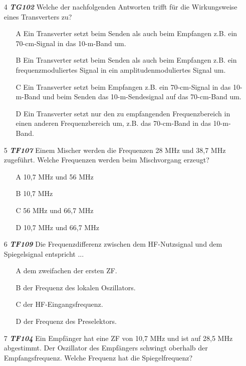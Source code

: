 \begin{enumerate} 
	\item[4] \emph{\textbf{TG102}} Welche der nachfolgenden Antworten trifft für die Wirkungsweise eines Transverters zu?
	\begin{enumerate}
	\itemsep1pt\parskip0pt
		\item[A] Ein Transverter setzt beim Senden als auch beim Empfangen z.B. ein 70-cm-Signal in das 10-m-Band um.
		\item[B] Ein Transverter setzt beim Senden als auch beim Empfangen z.B. ein frequenzmoduliertes Signal in ein amplitudenmoduliertes Signal um.
		\item[C] Ein Transverter setzt beim Empfangen z.B. ein 70-cm-Signal in das 10-m-Band und beim Senden das 10-m-Sendesignal auf das 70-cm-Band um.
		\item[D] Ein Transverter setzt nur den zu empfangenden Frequenzbereich in einen anderen Frequenzbereich um, z.B. das 70-cm-Band in das 10-m-Band.
	\end{enumerate} 
	\item[5] \emph{\textbf{TF107 }} Einem Mischer werden die Frequenzen 28 MHz und 38,7 MHz zugeführt. Welche Frequenzen werden beim Mischvorgang erzeugt?
	\begin{enumerate}
	\itemsep1pt\parskip0pt
		\item[A] 10,7 MHz und 56 MHz
		\item[B] 10,7 MHz
		\item[C]  56 MHz und 66,7 MHz
		\item[D] 10,7 MHz und 66,7 MHz
	\end{enumerate} 
	\item[6] \emph{\textbf{TF109}} Die Frequenzdifferenz zwischen dem HF-Nutzsignal und dem Spiegelsignal entspricht ...
	\begin{enumerate}
	\itemsep1pt\parskip0pt
		\item[A] dem zweifachen der ersten ZF. 
		\item[B] der Frequenz des lokalen Oszillators.
		\item[C] der HF-Eingangsfrequenz.
		\item[D] der Frequenz des Preselektors.
	\end{enumerate} 
	\item[7] \emph{\textbf{TF104}} Ein Empfänger hat eine ZF von 10,7 MHz und ist auf 28,5 MHz abgestimmt. Der Oszillator des Empfängers schwingt oberhalb der Empfangsfrequenz. Welche Frequenz hat die Spiegelfrequenz?

\end{enumerate}
